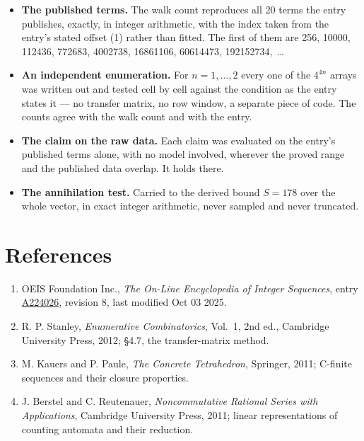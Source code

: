 \documentclass[11pt]{article}
\theoremstyle{definition}
\begin{document}
\begin{itemize}

\item {\bfseries The published terms.} The walk count reproduces all 20 terms the entry publishes, exactly, in integer arithmetic, with the index taken from the entry's stated offset (1) rather than fitted. The first of them are 256, 10000, 112436, 772683, 4002738, 16861106, 60614473, 192152734,~\dots

\item {\bfseries An independent enumeration.} For $n = 1,\dots,2$ every one of the $4^{4n}$ arrays was written out and tested cell by cell against the condition as the entry states it --- no transfer matrix, no row window, a separate piece of code. The counts agree with the walk count and with the entry.

\item {\bfseries The claim on the raw data.} Each claim was evaluated on the entry's published terms alone, with no model involved, wherever the proved range and the published data overlap. It holds there.

\item {\bfseries The annihilation test.} Carried to the derived bound $S = 178$ over the whole vector, in exact integer arithmetic, never sampled and never truncated.

\end{itemize}

\section{References}

\begin{enumerate}

\item OEIS Foundation Inc., \emph{The On-Line Encyclopedia of Integer Sequences}, entry \href{https://oeis.org/A224026}{A224026}, revision 8, last modified Oct 03 2025.

\item R. P. Stanley, \emph{Enumerative Combinatorics}, Vol.~1, 2nd ed., Cambridge University Press, 2012; \S4.7, the transfer-matrix method.

\item M. Kauers and P. Paule, \emph{The Concrete Tetrahedron}, Springer, 2011; C-finite sequences and their closure properties.

\item J. Berstel and C. Reutenauer, \emph{Noncommutative Rational Series with Applications}, Cambridge University Press, 2011; linear representations of counting automata and their reduction.

\end{enumerate}
\end{document}
